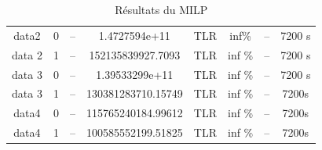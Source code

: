 \begin{table}[h!tbp]
\begin{tabular}{|c|c|c|c|c|c|c|c|}
        data2                                    & 0                                   & --              & 1.4727594e+11      & TLR             & inf\%     & --    & 7200 s   \\
        data 2                                   & 1                                   & --              & 152135839927.7093  & TLR             & inf \%    & --    & 7200 s   \\
        data 3                                   & 0                                   & --              & 1.39533299e+11     & TLR             & inf \%    & --    & 7200 s   \\
        data 3                                   & 1                                   & --              & 130381283710.15749 & TLR             & inf \%    & --    & 7200s    \\
        data4                                    & 0                                   & --              & 115765240184.99612 & TLR             & inf \%    & --    & 7200s    \\
        data4                                    & 1                                   & --              & 100585552199.51825 & TLR             & inf \%    & --    & 7200s    \\
        \hline
    \end{tabular}
    \caption{Résultats du MILP }
    \label{tab:MILP}
\end{table}